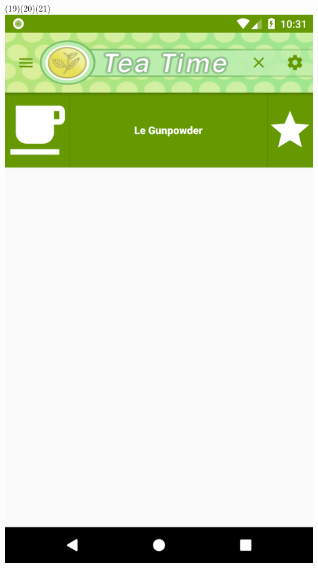 \documentclass[a4paper,12pt]{article}
\begin{document}
\begin{spacing}{1}
	\\\\\\\\\\\\\\\\\\\\\\\\\\\\\\\\\\\\\\
	(19)\space\space\space\space\space\space\space\space\space\space\space\space\space\space\space\space\space\space\space\space\space\space\space(20)\space\space\space\space\space\space\space\space\space\space\space\space\space\space\space\space\space\space\space\space\space\space\space(21)\\
	\includegraphics*[scale=0.1]{Screenshot/19.png}    

\end{spacing}
\end{document}
